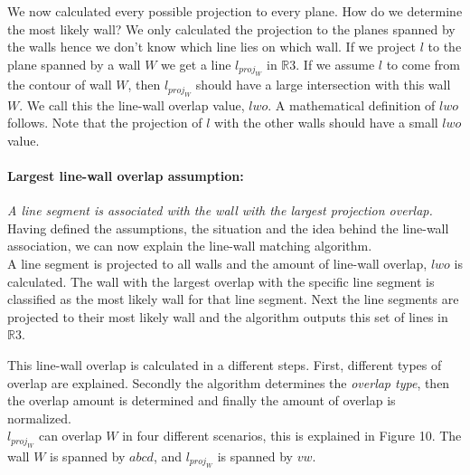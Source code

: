 	We now calculated every possible projection to every plane. How do we
	determine the most likely wall?  We only calculated the projection to the
	planes spanned by the walls hence we don't know which line lies on which
	wall.  If we project $l$ to the plane spanned
	by a wall $W$ we get a line $l_{proj_W}$ in $\mathbb{R}3$.  If we assume
	$l$ to come from the contour of wall $W$, then $l_{proj_W}$ should have a large
	intersection with this wall $W$. 
	We call this the line-wall overlap value, $lwo$.  A mathematical
	definition of $lwo$ follows.  Note that the projection of $l$ with the
	other walls should have a small $lwo$ value.\\

	\paragraph{Largest line-wall overlap assumption:}
	\emph{A line segment is associated with the wall with the largest projection
	overlap.}\\

	Having defined the assumptions, the situation and the idea behind the
	line-wall association, we can now explain the line-wall matching algorithm.\\ 

	A line segment is projected to all walls and the amount of line-wall
	overlap, $lwo$ is calculated. The wall with the largest overlap with the specific line
segment is classified as the most likely wall for that line segment.
	Next the line segments are projected to their most likely wall and the
	algorithm outputs this set of lines in $\mathbb{R}3$. 
	

	This line-wall overlap is calculated in a different steps.
	First, different types of overlap are explained. Secondly the algorithm
	determines the \emph{overlap type}, then the overlap amount is determined and
	finally the amount of overlap is normalized.\\

	$l_{proj_W}$ can overlap $W$ in four different scenarios, this is explained
	in Figure 10. The wall $W$ is spanned by $abcd$, and $l_{proj_W}$ is spanned
	by $vw$.
	
		
	\clearpage


